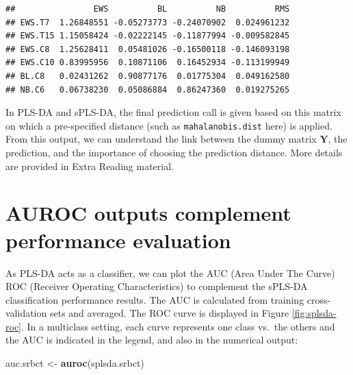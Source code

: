 \documentclass[]{book}
\newenvironment{Shaded}{\begin{snugshade}}{\end{snugshade}}
\newcommand{\KeywordTok}[1]{\textcolor[rgb]{0.13,0.29,0.53}{\textbf{#1}}}
\newcommand{\NormalTok}[1]{#1}
\newcommand{\StringTok}[1]{\textcolor[rgb]{0.31,0.60,0.02}{#1}}
\begin{document}
\begin{verbatim}
##                EWS          BL          NB          RMS
## EWS.T7  1.26848551 -0.05273773 -0.24070902  0.024961232
## EWS.T15 1.15058424 -0.02222145 -0.11877994 -0.009582845
## EWS.C8  1.25628411  0.05481026 -0.16500118 -0.146093198
## EWS.C10 0.83995956  0.10871106  0.16452934 -0.113199949
## BL.C8   0.02431262  0.90877176  0.01775304  0.049162580
## NB.C6   0.06738230  0.05086884  0.86247360  0.019275265
\end{verbatim}

In PLS-DA and sPLS-DA, the final prediction call is given based on this matrix on which a pre-specified distance (such as \texttt{mahalanobis.dist} here) is applied. From this output, we can understand the link between the dummy matrix \(\boldsymbol Y\), the prediction, and the importance of choosing the prediction distance. More details are provided in Extra Reading material.

\hypertarget{plsda:auroc}{%
\section{AUROC outputs complement performance evaluation}\label{plsda:auroc}}

As PLS-DA acts as a classifier, we can plot the AUC (Area Under The Curve) ROC (Receiver Operating Characteristics) to complement the sPLS-DA classification performance results. The AUC is calculated from training cross-validation sets and averaged. The ROC curve is displayed in Figure \ref{fig:splsda-roc}. In a multiclass setting, each curve represents one class vs.~the others and the AUC is indicated in the legend, and also in the numerical output:

\begin{Shaded}
\begin{Highlighting}[]
\NormalTok{auc.srbct <-}\StringTok{ }\KeywordTok{auroc}\NormalTok{(splsda.srbct)}
\end{Highlighting}
\end{Shaded}
\end{document}

